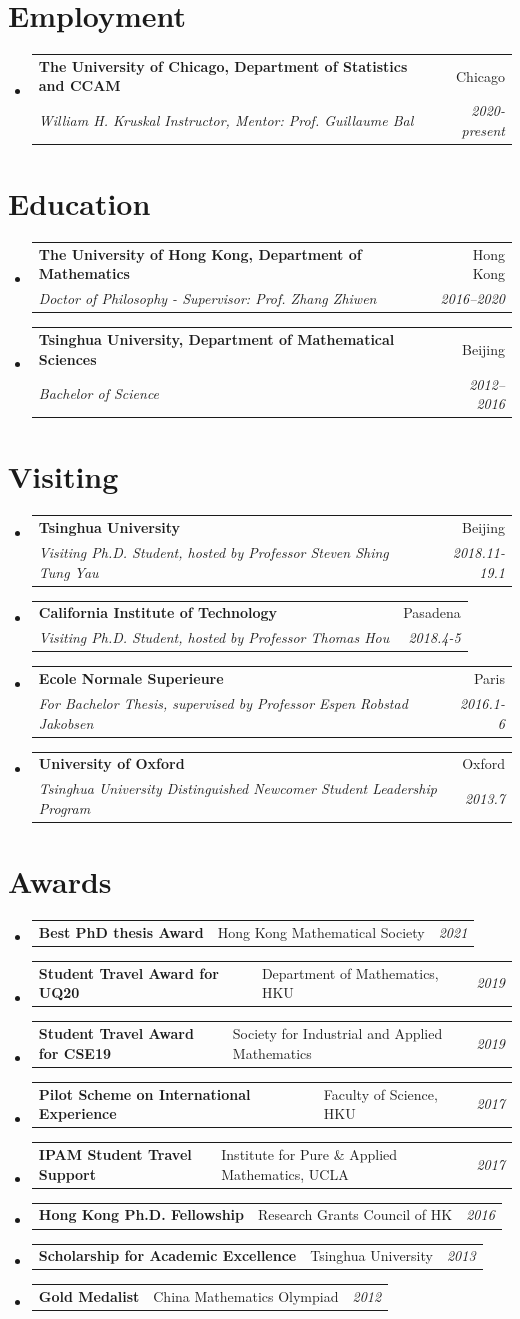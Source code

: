 \documentclass[a4paper,20pt]{article}
\makeatletter
\newcommand{\resumeSubheading}[4]{
	\vspace{-1pt}\item
	\begin{tabular*}{0.97\textwidth}{l@{\extracolsep{\fill}}r}
		\textbf{#1} & #2 \\
		\textit{#3} & \textit{#4} \\
	\end{tabular*}\vspace{-5pt}
}
\newcommand{\resumeSubItem}[3]{	\item{
		\begin{tabular*}{0.99\linewidth}{ll@{\extracolsep{\fill}}r}
			\textbf{#1} & #2 &  \textit{#3}
			\end{tabular*}\vspace{-5pt}
		}}
\newcommand{\resumeSubHeadingListStart}{\begin{itemize}[leftmargin=*]}
\newcommand{\resumeSubHeadingListEnd}{\end{itemize}}
\makeatother
\begin{document}
	\section{Employment}
		\resumeSubHeadingListStart
	\resumeSubheading{The University of Chicago, Department of Statistics and CCAM}{Chicago}{William H. Kruskal Instructor, Mentor: Prof. Guillaume Bal}{2020-present}

	\resumeSubHeadingListEnd
	\section{Education}
	\resumeSubHeadingListStart
	\resumeSubheading
	{The University of Hong Kong, Department of Mathematics}{Hong Kong}
	{Doctor of Philosophy - Supervisor: Prof. Zhang Zhiwen}{2016--2020}
	{}
	\resumeSubheading
	{Tsinghua University, Department of Mathematical Sciences}{Beijing}
	{Bachelor of Science}{2012--2016}

	\resumeSubHeadingListEnd
	\section{Visiting}
\resumeSubHeadingListStart
\resumeSubheading{Tsinghua University}{Beijing}
{Visiting Ph.D. Student, hosted by Professor Steven Shing Tung Yau}{2018.11-19.1}

\resumeSubheading{California Institute of Technology}{Pasadena}
{Visiting Ph.D. Student, hosted by Professor Thomas Hou}{2018.4-5}

\resumeSubheading{Ecole Normale Superieure}{Paris}
{For Bachelor Thesis, supervised by Professor Espen Robstad Jakobsen}{2016.1-6}

\resumeSubheading{University of Oxford}{Oxford}{Tsinghua University Distinguished Newcomer Student Leadership Program}{2013.7}

\resumeSubHeadingListEnd
	\section{Awards}
\resumeSubHeadingListStart
\resumeSubItem{Best PhD thesis Award }{ Hong Kong Mathematical Society}{2021}
\resumeSubItem{Student Travel Award for UQ20 }{ Department of Mathematics, HKU}{2019}
\resumeSubItem{Student Travel Award for CSE19 }{ Society for Industrial and Applied Mathematics}{2019}
\resumeSubItem{Pilot Scheme on International Experience }{ Faculty of Science, HKU}{2017}
\resumeSubItem{IPAM Student Travel Support }{ Institute for Pure \& Applied Mathematics, UCLA}{2017}
\resumeSubItem{Hong Kong Ph.D. Fellowship }{ Research Grants Council of HK}{2016}
\resumeSubItem{Scholarship for Academic Excellence }{ Tsinghua University}{2013}
\resumeSubItem{Gold Medalist }{ China Mathematics Olympiad}{2012}
\resumeSubHeadingListEnd
\end{document}
